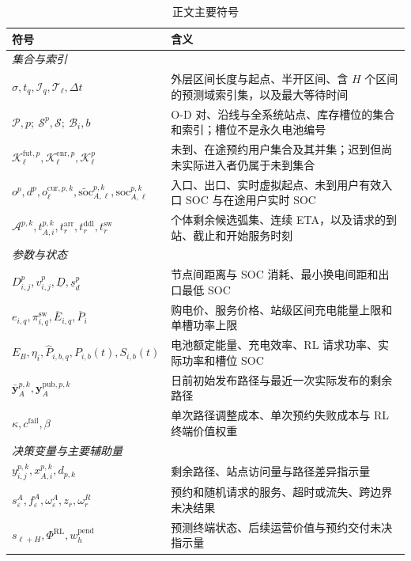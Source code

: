 \documentclass[12pt,a4paper,UTF8]{ctexart}
\begin{document}
\begin{table}[!htbp]
  \centering
  \caption{正文主要符号}
  \label{tab:notation}
  \small
  \setlength{\tabcolsep}{3pt}
  \renewcommand{\arraystretch}{0.98}
  \begin{tabular}{@{}lp{11cm}@{}}
    \toprule
    \textbf{符号} & \textbf{含义} \\
    \midrule
    \multicolumn{2}{l}{\textit{集合与索引}} \\
    $\sigma,t_q,\mathcal I_q,\mathcal T_\ell,\Delta t$ & 外层区间长度与起点、半开区间、含 $H$ 个区间的预测域索引集，以及最大等待时间 \\
    $\mathcal P,p;\ \mathcal S^p,\mathcal S;\ \mathcal B_i,b$ & O-D 对、沿线与全系统站点、库存槽位的集合和索引；槽位不是永久电池编号 \\
    $\mathcal K_\ell^{\mathrm{fut},p},\mathcal K_\ell^{\mathrm{enr},p},\mathcal K_\ell^p$ & 未到、在途预约用户集合及其并集；迟到但尚未实际进入者仍属于未到集合 \\
    $o^p,d^p,o_\ell^{\mathrm{cur},p,k},\widetilde{\mathrm{soc}}_{A,\ell}^{p,k},\mathrm{soc}_{A,\ell}^{p,k}$ & 入口、出口、实时虚拟起点、未到用户有效入口 SOC 与在途用户实时 SOC \\
    $\mathcal A^{p,k},t_{A,i}^{p,k},t_r^{\mathrm{arr}},t_r^{\mathrm{ddl}},t_r^{\mathrm{sw}}$ & 个体剩余候选弧集、连续 ETA，以及请求的到站、截止和开始服务时刻 \\
    \midrule
    \multicolumn{2}{l}{\textit{参数与状态}} \\
    $D_{i,j}^{p},v_{i,j}^{p},\underline D,\underline s_d^p$ & 节点间距离与 SOC 消耗、最小换电间距和出口最低 SOC \\
    $e_{i,q},\pi_{i,q}^{\mathrm{sw}},\overline E_{i,q},\overline P_i$ & 购电价、服务价格、站级区间充电能量上限和单槽功率上限 \\
    $E_B,\eta_i,\widehat P_{i,b,q},P_{i,b}(t),S_{i,b}(t)$ & 电池额定能量、充电效率、RL 请求功率、实际功率和槽位 SOC \\
    $\bar{\mathbf y}_{A}^{p,k},\mathbf y_{A}^{\mathrm{pub},p,k}$ & 日前初始发布路径与最近一次实际发布的剩余路径 \\
    $\kappa,c^{\mathrm{fail}},\beta$ & 单次路径调整成本、单次预约失败成本与 RL 终端价值权重 \\
    \midrule
    \multicolumn{2}{l}{\textit{决策变量与主要辅助量}} \\
    $y_{i,j}^{p,k},x_{A,i}^{p,k},d_{p,k}$ & 剩余路径、站点访问量与路径差异指示量 \\
    $s_\varepsilon^A,f_\varepsilon^A,\omega_\varepsilon^A,z_r,\omega_r^R$ & 预约和随机请求的服务、超时或流失、跨边界未决结果 \\
    $s_{\ell+H},\Phi^{\mathrm{RL}},w_h^{\mathrm{pend}}$ & 预测终端状态、后续运营价值与预约交付未决指示量 \\
    \bottomrule
  \end{tabular}
\end{table}
\end{document}
